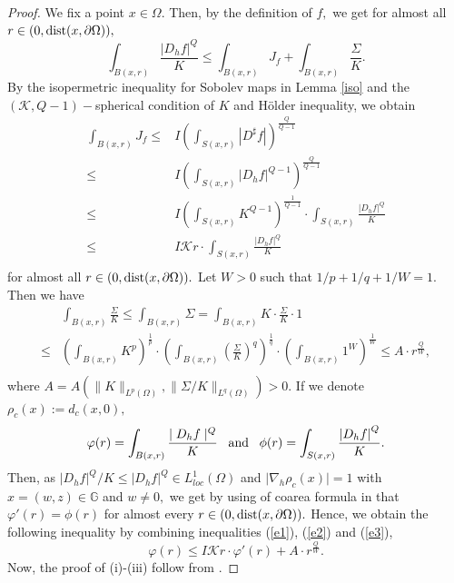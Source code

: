 \documentclass[11pt,twoside]{article}
\theoremstyle{definition}
\theoremstyle{remark}
\newcommand{\abs}[1]{\left|#1\right|}
\begin{document}
\begin{proof}
We fix a point $x\in\Omega.$  Then, by the definition of $f,$ we get for almost all $r\in(0,{\rm dist}(x,\partial\Omega)),$
\begin{equation}\label{e1}
\int_{B(x,r)}\frac{\abs{ D_{h}f}^{Q}}{K}\leq\int_{B(x,r) }J_{f}+\int_{B(x,r)}\frac{\Sigma}{K}.
\end{equation}
By the isopermetric inequality for Sobolev maps in Lemma \ref{iso} and the $(\mathcal{K},Q-1)-$spherical condition of $K$ and H\"{o}lder inequality, we obtain
\begin{equation}\label{e2}
\begin{aligned}
\int_{B(x,r) }J_{f}\leq& I\left(\int_{ S(x,r)}\abs{ D^{\sharp}f}\right)^{\frac{Q}{Q-1}}\\
\leq& I\left(\int_{S(x,r)}\abs{D_{h}f}^{Q-1}\right)^{\frac{Q}{Q-1}}\\
\leq& I\left(\int_{S(x,r)}K^{Q-1}\right)^{\frac{1}{Q-1}}\cdot\int_{S(x,r)}\frac{\abs{ D_{h}f}^{Q}}{K}\\
\leq& I\mathcal{K}r\cdot\int_{S(x,r)}\frac{\abs{D_{h}f}^{Q}}{K}\\
\end{aligned}
\end{equation}
for almost all $r\in(0,{\rm dist}(x,\partial\Omega)).$ Let $W>0$ such that $1/p+1/q+1/W=1.$ Then we have
\begin{equation}\label{e3}
\begin{aligned}
&\int_{B(x,r)}\frac{\Sigma}{K}\leq\int_{B(x,r)}\Sigma=\int_{B(x,r)}K\cdot\frac{\Sigma}{K}\cdot1\\
\leq& \left(\int_{B(x,r)}K^{p}\right)^{\frac{1}{p}}\cdot\left(\int_{B(x,r)}\left(\frac{\Sigma}{K}\right)^{q}\right)^{\frac{1}{q}}\cdot\left(\int_{B(x,r)}1^{W}\right)^{\frac{1}{W}}\leq A\cdot r^{\frac{Q}{W}},\\
\end{aligned}
\end{equation}
where $A=A(\|K\|_{L^{p}(\Omega)},\|\Sigma/K\|_{L^{q}(\Omega)})>0.$
If we denote $\rho_{c}(x):=d_{c}(x,0),$
$$\varphi(r)=\int_{B(x,r)}\frac{\mid D_{h}f\mid^{Q}}{K}\;\;\;{\rm and}\;\;\;\phi(r)=\int_{S(x,r)}\frac{\abs{D_{h}f}^{Q}}{K}.$$
 Then,  as $\vert D_{h}f\vert^{Q}/K\leq\vert D_{h}f\vert^{Q}\in L_{loc}^{1}(\Omega)$ and $\vert\nabla_{h}\rho_{c}(x)\vert=1$ with $x=(w,z)\in \mathbb{G}$ and $w\neq0,$ 
 we get by using of coarea formula in \cite[(2.13)]{Vod07} that $\varphi'(r)=\phi(r)$ for almost every $r\in(0,{\rm dist}(x,\partial\Omega)).$ Hence, we obtain the following inequality by combining inequalities (\ref{e1}), (\ref{e2}) and (\ref{e3}),
$$\varphi(r)\leq I\mathcal{K}r\cdot\varphi'(r)+A\cdot r^{\frac{Q}{W}}.$$
Now, the proof of (i)-(iii) follow from \cite[Lemma 3.2]{KO221}. 
\end{proof}
\end{document}
